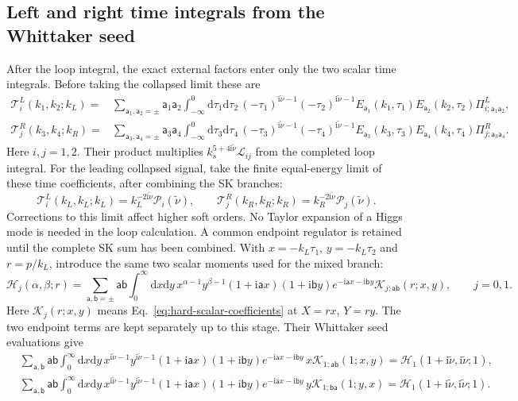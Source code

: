 \documentclass[a4paper,12pt]{article}
\newcommand{\ii}{\mathrm i}
\newcommand{\tn}{\tilde\nu}
\def\aa{\mathsf a}
\newcommand{\bb}{\mathsf b}
\newcommand{\di}{\mathrm d}
\begin{document}
\subsection{Left and right time integrals from the Whittaker seed}
\label{sec:seed-eval}
After the loop integral, the exact external factors enter only the
two scalar time integrals. Before taking the collapsed limit these are
\begin{align}
 \mathcal T_i^L(k_1,k_2;k_L)
 ={}&\sum_{\aa_1,\aa_2=\pm}\aa_1\aa_2
 \int_{-\infty}^0\di\tau_1\di\tau_2\,
 (-\tau_1)^{\ii\tn-1}(-\tau_2)^{\ii\tn-1}
 E_{\aa_1}(k_1,\tau_1)E_{\aa_2}(k_2,\tau_2)
 \Pi^L_{i;\aa_1\aa_2},\nonumber\\
 \mathcal T_j^R(k_3,k_4;k_R)
 ={}&\sum_{\aa_3,\aa_4=\pm}\aa_3\aa_4
 \int_{-\infty}^0\di\tau_3\di\tau_4\,
 (-\tau_3)^{\ii\tn-1}(-\tau_4)^{\ii\tn-1}
 E_{\aa_3}(k_3,\tau_3)E_{\aa_4}(k_4,\tau_4)
 \Pi^R_{j;\aa_3\aa_4}.
 \label{eq:left-right-time-integrals}
\end{align}
Here $i,j=1,2$. Their product multiplies
$k_s^{5+4\ii\tn}\mathscr L_{ij}$ from the completed loop integral.
For the leading collapsed signal, take the finite equal-energy
limit of these time coefficients, after combining the SK branches:
\begin{equation}
 \mathcal T_i^L(k_L,k_L;k_L)=k_L^{-2\ii\tn}\mathcal P_i(\tn),
 \qquad
 \mathcal T_j^R(k_R,k_R;k_R)=k_R^{-2\ii\tn}\mathcal P_j(\tn).
 \label{eq:leading-time-limit}
\end{equation}
Corrections to this limit affect higher soft orders. No Taylor
expansion of a Higgs mode is needed in the loop calculation.
A common endpoint regulator is retained until the complete SK sum
has been combined. With $x=-k_L\tau_1$, $y=-k_L\tau_2$ and $r=p/k_L$,
introduce the same two scalar moments used for the mixed branch:
\begin{equation}
 \mathcal H_j(\alpha,\beta;r)
 =\sum_{\aa,\bb=\pm}\aa\bb\int_0^\infty\di x\di y\,
 x^{\alpha-1}y^{\beta-1}
 (1+\ii \aa x)(1+\ii \bb y)e^{-\ii \aa x-\ii \bb y}
 \mathcal K_{j;\aa\bb}(r;x,y),\qquad j=0,1.
 \label{eq:hard-def}
\end{equation}
Here $\mathcal K_j(r;x,y)$ means
Eq.~\eqref{eq:hard-scalar-coefficients} at $X=rx$, $Y=ry$.
The two endpoint terms are kept separately up to this stage.
Their Whittaker seed evaluations give
\begin{align}
 &\sum_{\aa,\bb}\aa\bb\int_0^\infty\di x\di y\,
 x^{\ii\tn-1}y^{\ii\tn-1}(1+\ii \aa x)(1+\ii \bb y)e^{-\ii \aa x-\ii \bb y}
 \,x\mathcal K_{1;\aa\bb}(1;x,y)
 =\mathcal H_1(1+\ii\tn,\ii\tn;1),\nonumber\\
 &\sum_{\aa,\bb}\aa\bb\int_0^\infty\di x\di y\,
 x^{\ii\tn-1}y^{\ii\tn-1}(1+\ii \aa x)(1+\ii \bb y)e^{-\ii \aa x-\ii \bb y}
 \,y\mathcal K_{1;\bb\aa}(1;y,x)
 =\mathcal H_1(1+\ii\tn,\ii\tn;1).
 \label{eq:separate-endpoint-seeds}
\end{align}
\end{document}
